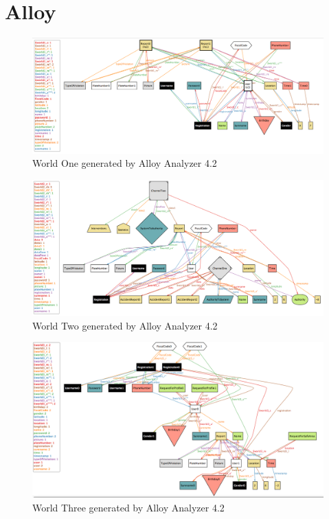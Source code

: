 \section{Alloy}
	
	
	\begin{figure}[H]	
		\centering
		\includegraphics[scale=0.35]{images/World1.png}
		\caption{World One generated by Alloy Analyzer 4.2}
	\end{figure}
	
	\begin{figure}[H]	
		\centering
		\includegraphics[scale=0.35]{images/World2.png}
		\caption{World Two generated by Alloy Analyzer 4.2}
	\end{figure}
	
	\begin{figure}[H]	
		\centering
		\includegraphics[scale=0.35]{images/World3.png}
		\caption{World Three generated by Alloy Analyzer 4.2}
	\end{figure}
	
